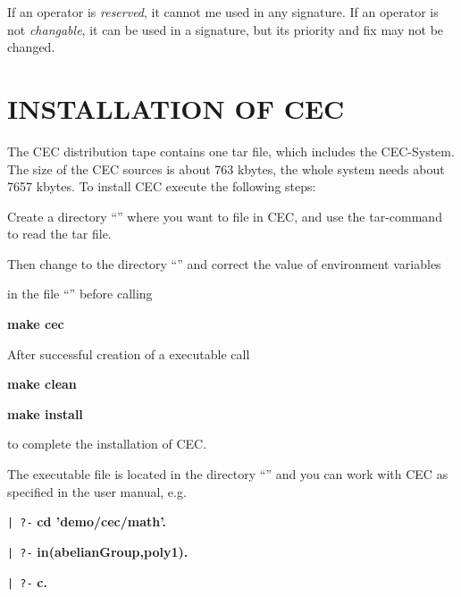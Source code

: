 If an operator is {\em reserved}, it cannot me used in any signature. If 
an operator is not {\em changable}, it can be used in a signature, but 
its priority and fix may not be changed. 

\section{INSTALLATION OF CEC}
The CEC distribution tape contains one tar file, which
includes the CEC-System. The size of the CEC sources is about 763 kbytes, the whole system needs
about  7657 kbytes.
To install CEC execute the following steps:\bigskip

\noindent
Create a directory ``'' where you want to file in CEC, 
and use the tar-command to read the tar file.

\noindent
Then change to the directory ``'' and correct
the value of environment variables\bigskip


\bigskip

\noindent
in the file ``'' before calling\bigskip

{\bf make cec}\bigskip

\noindent
After successful creation of a executable  call\bigskip

{\bf make clean}

{\bf make install}\bigskip

\noindent
to complete the installation of CEC.\bigskip

\noindent
The executable file is located in the directory ``'' and
you can work with CEC as specified in the user manual, e.g. \bigskip

\verb+| ?-+ {\bf cd 'demo/cec/math'.}

\verb+| ?-+ {\bf in(abelianGroup,poly1).}

\verb+| ?-+ {\bf c.}


